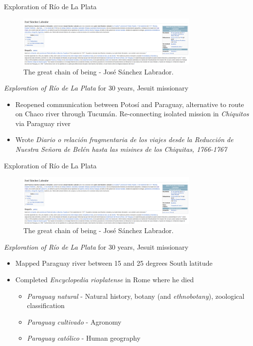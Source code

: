 \documentclass{beamer}
\begin{document}
\begin{frame}{Exploration of R\'{i}o de La Plata}
\small
\begin{figure}
\centering
\includegraphics[width=9cm]{figures/lab.png}
\caption{The great chain of being - Jos\'{e} S\'{a}nchez Labrador.}
\end{figure}
\textit{Exploration of R\'{i}o de La Plata} for 30 years, Jesuit missionary
\begin{itemize}
\item Reopened communication between Potos\'{i} and Paraguay, alternative to route on Chaco river through Tucum\'{a}n. Re-connecting isolated mission in \textit{Chiquitos} via Paraguay river
\item Wrote \textit{Diario o relaci\'{o}n fragmentaria de los viajes desde la Reducci\'{o}n de Nuestra Se\~{n}ora de Bel\'{e}n hasta las misines de los Chiquitas, 1766-1767}
\end{itemize}
\end{frame}

\begin{frame}{Exploration of R\'{i}o de La Plata}
\small
\begin{figure}
\centering
\includegraphics[width=9cm]{figures/lab.png}
\caption{The great chain of being - Jos\'{e} S\'{a}nchez Labrador.}
\end{figure}
\textit{Exploration of R\'{i}o de La Plata} for 30 years, Jesuit missionary
\begin{itemize}
\item Mapped Paraguay river between 15 and 25 degrees South latitude
\item Completed \textit{Encyclopedia rioplatense} in Rome where he died
\begin{itemize}
\item \textit{Paraguay natural} - Natural history, botany (and \textit{ethnobotany}), zoological classification
\item \textit{Paraguay cultivado} - Agronomy
\item \textit{Paraguay cat\'{o}lico} - Human geography
\end{itemize}
\end{itemize}
\end{frame}
\end{document}
